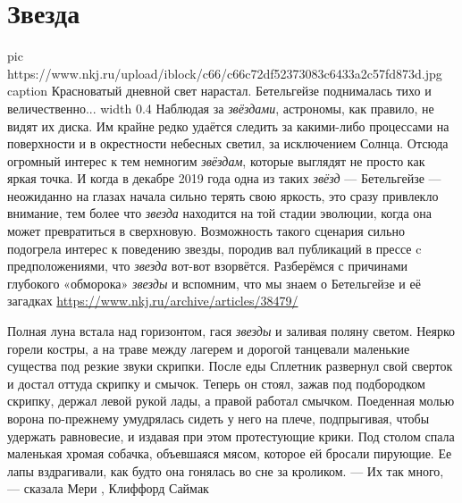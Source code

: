  
 
 
 
 
\chapter{Звезда}
\label{sec:slova.zvezda}

\ifcmt
  pic https://www.nkj.ru/upload/iblock/c66/c66c72df52373083c6433a2c57fd873d.jpg
	caption Красноватый дневной свет нарастал. Бетельгейзе поднималась тихо и величественно... 
	width 0.4
\fi
Наблюдая за \emph{звёздами}, астрономы, как правило, не видят их диска. Им
крайне редко удаётся следить за какими-либо процессами на поверхности и в
окрестности небесных светил, за исключением Солнца. Отсюда огромный интерес к
тем немногим \emph{звёздам}, которые выглядят не просто как яркая точка. И
когда в декабре 2019 года одна из таких \emph{звёзд} — Бетельгейзе — неожиданно
на глазах начала сильно терять свою яркость, это сразу привлекло внимание, тем
более что \emph{звезда} находится на той стадии эволюции, когда она может
превратиться в сверхновую. Возможность такого сценария сильно подогрела интерес
к поведению звезды, породив вал публикаций в прессе c предположениями, что
\emph{звезда} вот-вот взорвётся.  Разберёмся с причинами глубокого «обморока»
\emph{звезды} и вспомним, что мы знаем о Бетельгейзе и её загадках
\url{https://www.nkj.ru/archive/articles/38479/}

Полная луна встала над горизонтом, гася \emph{звезды} и заливая поляну светом. Неярко
горели костры, а на траве между лагерем и дорогой танцевали маленькие существа
под резкие звуки скрипки.  После еды Сплетник развернул свой сверток и достал
оттуда скрипку и смычок.  Теперь он стоял, зажав под подбородком скрипку,
держал левой рукой лады, а правой работал смычком. Поеденная молью ворона
по-прежнему умудрялась сидеть у него на плече, подпрыгивая, чтобы удержать
равновесие, и издавая при этом протестующие крики.  Под столом спала маленькая
хромая собачка, объевшаяся мясом, которое ей бросали пирующие. Ее лапы
вздрагивали, как будто она гонялась во сне за кроликом.  — Их так много, —
сказала Мери
, Клиффорд Саймак

